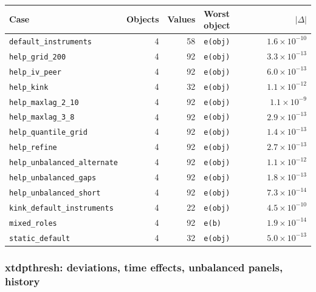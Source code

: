 \documentclass[
  10.5pt,
  a4paper,
]{article}
\begin{document}
\begin{longtable}{@{}p{3.6cm}rrp{4.9cm}r@{}}
\toprule
Case & Objects & Values & Worst object & $|\Delta|$ \\
\midrule
\endhead
\texttt{default\_\allowbreak{}instruments} & 4 & 58 & \texttt{e(obj)} & $1.6\times10^{-10}$ \\
\texttt{help\_\allowbreak{}grid\_\allowbreak{}200} & 4 & 92 & \texttt{e(obj)} & $3.3\times10^{-13}$ \\
\texttt{help\_\allowbreak{}iv\_\allowbreak{}peer} & 4 & 92 & \texttt{e(obj)} & $6.0\times10^{-13}$ \\
\texttt{help\_\allowbreak{}kink} & 4 & 32 & \texttt{e(obj)} & $1.1\times10^{-12}$ \\
\texttt{help\_\allowbreak{}maxlag\_\allowbreak{}2\_\allowbreak{}10} & 4 & 92 & \texttt{e(obj)} & $1.1\times10^{-9}$ \\
\texttt{help\_\allowbreak{}maxlag\_\allowbreak{}3\_\allowbreak{}8} & 4 & 92 & \texttt{e(obj)} & $2.9\times10^{-13}$ \\
\texttt{help\_\allowbreak{}quantile\_\allowbreak{}grid} & 4 & 92 & \texttt{e(obj)} & $1.4\times10^{-13}$ \\
\texttt{help\_\allowbreak{}refine} & 4 & 92 & \texttt{e(obj)} & $2.7\times10^{-13}$ \\
\texttt{help\_\allowbreak{}unbalanced\_\allowbreak{}alternate} & 4 & 92 & \texttt{e(obj)} & $1.1\times10^{-12}$ \\
\texttt{help\_\allowbreak{}unbalanced\_\allowbreak{}gaps} & 4 & 92 & \texttt{e(obj)} & $1.8\times10^{-13}$ \\
\texttt{help\_\allowbreak{}unbalanced\_\allowbreak{}short} & 4 & 92 & \texttt{e(obj)} & $7.3\times10^{-14}$ \\
\texttt{kink\_\allowbreak{}default\_\allowbreak{}instruments} & 4 & 22 & \texttt{e(obj)} & $4.5\times10^{-10}$ \\
\texttt{mixed\_\allowbreak{}roles} & 4 & 92 & \texttt{e(b)} & $1.9\times10^{-14}$ \\
\texttt{static\_\allowbreak{}default} & 4 & 32 & \texttt{e(obj)} & $5.0\times10^{-13}$ \\
\bottomrule
\end{longtable}

\subsubsection*{xtdpthresh: deviations, time effects, unbalanced panels, history}
\end{document}
